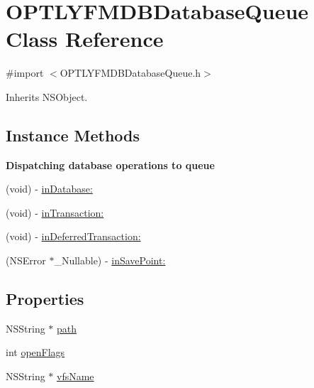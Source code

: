 \hypertarget{interface_o_p_t_l_y_f_m_d_b_database_queue}{}\section{O\+P\+T\+L\+Y\+F\+M\+D\+B\+Database\+Queue Class Reference}
\label{interface_o_p_t_l_y_f_m_d_b_database_queue}


{\ttfamily \#import $<$O\+P\+T\+L\+Y\+F\+M\+D\+B\+Database\+Queue.\+h$>$}



Inherits N\+S\+Object.

\subsection*{Instance Methods}
\begin{Indent}\textbf{ Dispatching database operations to queue}\par
{\em 

 

 }\begin{DoxyCompactItemize}
\item 
(void) -\/ \mbox{\hyperlink{interface_o_p_t_l_y_f_m_d_b_database_queue_abc4d8336b211f69f6bd9dddfbf867e77}{in\+Database\+:}}
\item 
(void) -\/ \mbox{\hyperlink{interface_o_p_t_l_y_f_m_d_b_database_queue_a2b3f5f9d9820bb35c8b199bf0f551f2f}{in\+Transaction\+:}}
\item 
(void) -\/ \mbox{\hyperlink{interface_o_p_t_l_y_f_m_d_b_database_queue_a89496d5659141d09463b0f06232a6985}{in\+Deferred\+Transaction\+:}}
\item 
(N\+S\+Error $\ast$\+\_\+\+Nullable) -\/ \mbox{\hyperlink{interface_o_p_t_l_y_f_m_d_b_database_queue_af31652390dec87fa2d97d9e9724558f9}{in\+Save\+Point\+:}}
\end{DoxyCompactItemize}
\end{Indent}
\subsection*{Properties}
\begin{DoxyCompactItemize}
\item 
N\+S\+String $\ast$ \mbox{\hyperlink{interface_o_p_t_l_y_f_m_d_b_database_queue_a8b1238f775d8242d4cccc2e797b24ff1}{path}}
\item 
int \mbox{\hyperlink{interface_o_p_t_l_y_f_m_d_b_database_queue_aa1c1ac1e51de11c9ea80f46b87e93cfa}{open\+Flags}}
\item 
N\+S\+String $\ast$ \mbox{\hyperlink{interface_o_p_t_l_y_f_m_d_b_database_queue_acd3178ef3045e2fdda8e33d7af3a1115}{vfs\+Name}}
\end{DoxyCompactItemize}
